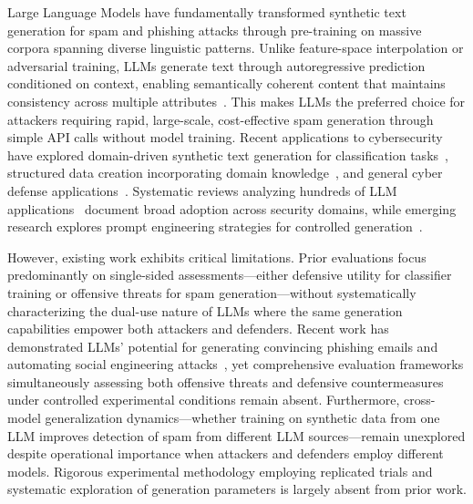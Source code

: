 Large Language Models have fundamentally transformed synthetic text generation for spam and phishing attacks through pre-training on massive corpora spanning diverse linguistic patterns. Unlike feature-space interpolation or adversarial training, LLMs generate text through autoregressive prediction conditioned on context, enabling semantically coherent content that maintains consistency across multiple attributes~\cite{razmyslovich2025eltex,almorjan2025large}. This makes LLMs the preferred choice for attackers requiring rapid, large-scale, cost-effective spam generation through simple API calls without model training. Recent applications to cybersecurity have explored domain-driven synthetic text generation for classification tasks~\cite{razmyslovich2025eltex,zhang2025llms,ammara2024synthetic}, structured data creation incorporating domain knowledge~\cite{almorjan2025large}, and general cyber defense applications~\cite{hassanin2024comprehensive}. Systematic reviews analyzing hundreds of LLM applications~\cite{zhang2025llms,ding2023tmg} document broad adoption across security domains, while emerging research explores prompt engineering strategies for controlled generation~\cite{chen2025unleashing,de2023unsupervised}.

However, existing work exhibits critical limitations. Prior evaluations focus predominantly on single-sided assessments—either defensive utility for classifier training or offensive threats for spam generation—without systematically characterizing the dual-use nature of LLMs where the same generation capabilities empower both attackers and defenders. Recent work has demonstrated LLMs' potential for generating convincing phishing emails and automating social engineering attacks~\cite{bethany2024large,afane2024next,weinz2025impact,ai2024defending,thapa2025large}, yet comprehensive evaluation frameworks simultaneously assessing both offensive threats and defensive countermeasures under controlled experimental conditions remain absent. Furthermore, cross-model generalization dynamics—whether training on synthetic data from one LLM improves detection of spam from different LLM sources—remain unexplored despite operational importance when attackers and defenders employ different models. Rigorous experimental methodology employing replicated trials and systematic exploration of generation parameters is largely absent from prior work.
